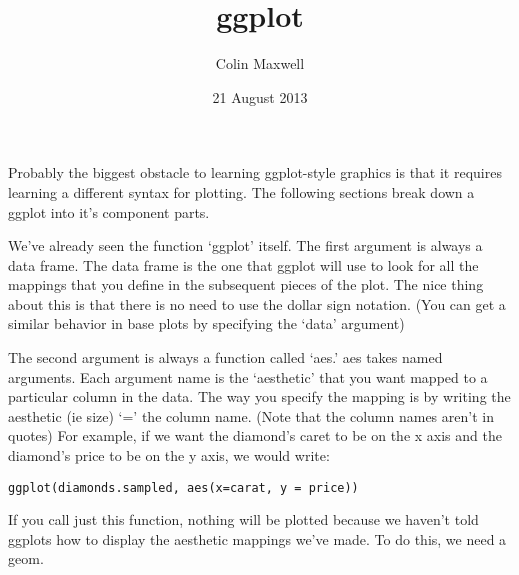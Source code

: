 \documentclass[11pt]{article}
\title{ggplot}
\author{Colin Maxwell}
\date{21 August 2013}
\begin{document}
\maketitle

\setcounter{tocdepth}{3}
\tableofcontents
\vspace*{1cm}
Probably the biggest obstacle to learning ggplot-style graphics is
  that it requires learning a different syntax for plotting. The
  following sections break down a ggplot into it's component parts.

We've already seen the function `ggplot' itself. The first argument is
always a data frame. The data frame is the one that ggplot will use to
look for all the mappings that you define in the subsequent pieces of
the plot. The nice thing about this is that there is no need to use
the dollar sign notation. (You can get a similar behavior in base
plots by specifying the `data' argument)

The second argument is always a function called `aes.' aes takes named
arguments. Each argument name is the `aesthetic' that you want mapped
to a particular column in the data. The way you specify the mapping is
by writing the aesthetic (ie size) `=' the column name. (Note that the column names aren't in quotes) For example, if we want the diamond's caret to be on the x axis and the diamond's price to be on the y axis, we would write:

\begin{verbatim}
ggplot(diamonds.sampled, aes(x=carat, y = price))
\end{verbatim}

If you call just this function, nothing will be plotted because we haven't told ggplots how to
display the aesthetic mappings we've made. To do this, we need a geom.
\end{document}
